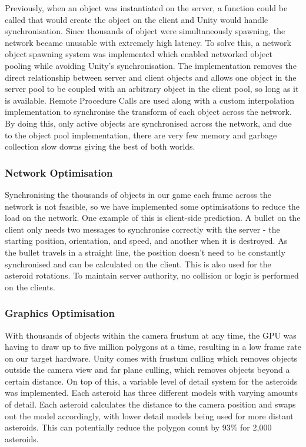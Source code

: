 \documentclass[a4paper,11pt]{article}
\begin{document}
Previously, when an object was instantiated on the server, a function could be called that would create the object on the client and Unity would handle synchronisation. Since thousands of object were   simultaneously spawning, the network became unusable with extremely high latency. To solve this, a network object spawning system was implemented which enabled networked object pooling while avoiding Unity’s synchronisation. The implementation removes the direct relationship between server and client objects and allows one object in the server pool to be coupled with an arbitrary object in the client pool, so long as it is available. Remote Procedure Calls are used along with a custom interpolation implementation to synchronise the transform of each object across the network. By doing this, only active objects are synchronised across the network, and due to the object pool implementation, there are very few memory and garbage collection slow downs giving the best of both worlds.

\subsubsection{Network Optimisation}
Synchronising the thousands of objects in our game each frame across the network is not feasible, so we have implemented some optimisations to reduce the load on the network. One example of this is client-side prediction. A bullet on the client only needs two messages to synchronise correctly with the server - the starting position, orientation, and speed, and another when it is destroyed. As the bullet travels in a straight line, the position doesn’t need to be constantly synchronised and can be calculated on the client. This is also used for the asteroid rotations. To maintain server authority, no collision or logic is performed on the clients.

\subsubsection{Graphics Optimisation}
With thousands of objects within the camera frustum at any time, the GPU was having to draw up to five million polygons at a time, resulting in a low frame rate on our target hardware. Unity comes with frustum culling which removes objects outside the camera view and far plane culling, which removes objects beyond a certain distance. On top of this, a variable level of detail system for the asteroids was implemented. Each asteroid has three different models with varying amounts of detail. Each asteroid calculates the distance to the camera position and swaps out the model accordingly, with lower detail models being used for more distant asteroids. This can potentially reduce the polygon count by 93\% for 2,000 asteroids.
\end{document}
